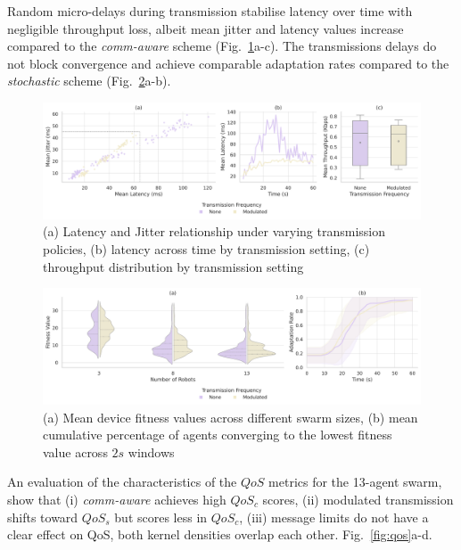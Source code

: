 \documentclass[conference]{IEEEtran}
\begin{document}
Random micro-delays during transmission stabilise latency over time with negligible throughput loss, albeit mean jitter and latency values increase compared to the \emph{comm-aware} scheme (Fig.~\ref{fig:frequency}a-c). The transmissions delays do not block convergence and achieve comparable adaptation rates compared to the \emph{stochastic} scheme (Fig.~\ref{fig:f-performance}a-b). \\

\begin{figure}[h]
    \centering
    \includegraphics[width=1\textwidth]{frequency_impact.pdf}
    \caption{(a) Latency and Jitter relationship under varying transmission policies, (b) latency across time by transmission setting, (c) throughput distribution by transmission setting}
    \label{fig:frequency}
\end{figure}

\begin{figure}[h]
    \centering
    \includegraphics[width=1\textwidth]{f_performance_impact.pdf}
    \caption{(a) Mean device fitness values across different swarm sizes, (b) mean cumulative percentage of agents converging to the lowest fitness value across $2s$ windows}
    \label{fig:f-performance}
\end{figure}

An evaluation of the characteristics of the $QoS$ metrics for the 13-agent swarm, show that (i) \emph{comm-aware} achieves high $QoS_c$ scores, (ii) modulated transmission shifts toward $QoS_s$ but scores less in $QoS_c$, (iii) message limits do not have a clear effect on QoS, both kernel densities overlap each other. Fig.~\ref{fig:qos}a-d. \\
\end{document}
